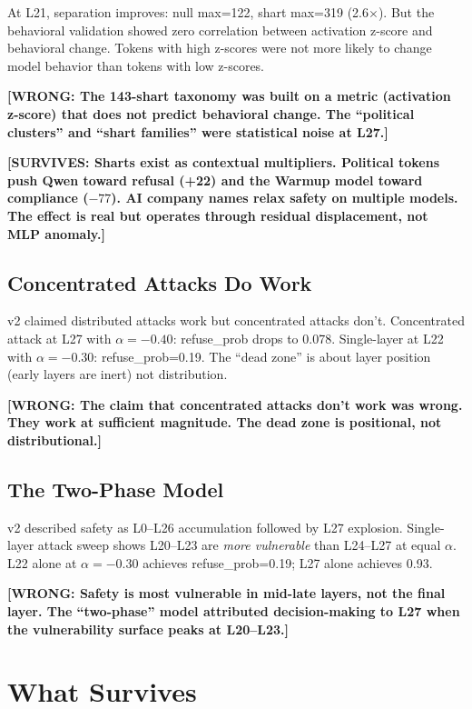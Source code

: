\documentclass[11pt,a4paper]{article}
\newcommand{\wrong}[1]{\textcolor{wrong}{\textbf{[WRONG: #1]}}}
\newcommand{\surv}[1]{\textcolor{surv}{\textbf{[SURVIVES: #1]}}}
\begin{document}
At L21, separation improves: null max=122, shart max=319 (2.6$\times$). But the behavioral validation showed zero correlation between activation z-score and behavioral change. Tokens with high z-scores were not more likely to change model behavior than tokens with low z-scores.

\wrong{The 143-shart taxonomy was built on a metric (activation z-score) that does not predict behavioral change. The ``political clusters'' and ``shart families'' were statistical noise at L27.}

\surv{Sharts exist as contextual multipliers. Political tokens push Qwen toward refusal (+22) and the Warmup model toward compliance ($-77$). AI company names relax safety on multiple models. The effect is real but operates through residual displacement, not MLP anomaly.}

\subsection{Concentrated Attacks Do Work}
v2 claimed distributed attacks work but concentrated attacks don't. Concentrated attack at L27 with $\alpha=-0.40$: refuse\_prob drops to 0.078. Single-layer at L22 with $\alpha=-0.30$: refuse\_prob=0.19. The ``dead zone'' is about layer position (early layers are inert) not distribution.

\wrong{The claim that concentrated attacks don't work was wrong. They work at sufficient magnitude. The dead zone is positional, not distributional.}

\subsection{The Two-Phase Model}
v2 described safety as L0--L26 accumulation followed by L27 explosion. Single-layer attack sweep shows L20--L23 are \textit{more vulnerable} than L24--L27 at equal $\alpha$. L22 alone at $\alpha=-0.30$ achieves refuse\_prob=0.19; L27 alone achieves 0.93.

\wrong{Safety is most vulnerable in mid-late layers, not the final layer. The ``two-phase'' model attributed decision-making to L27 when the vulnerability surface peaks at L20--L23.}

\section{What Survives}
\end{document}
